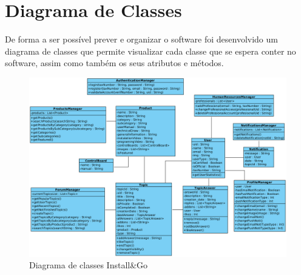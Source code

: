 \section{Diagrama de Classes}

De forma a ser possível prever e organizar o software foi desenvolvido um diagrama de classes que permite visualizar cada classe que se espera conter no software, assim como também os seus atributos e métodos.

\begin{figure}[htb]
    \centering
    
    \includegraphics[width=\textwidth]{images/diagramas/diagrama_classes.png}
    \caption{Diagrama de classes Install\&Go}
    \label{fig:15}
\end{figure}
